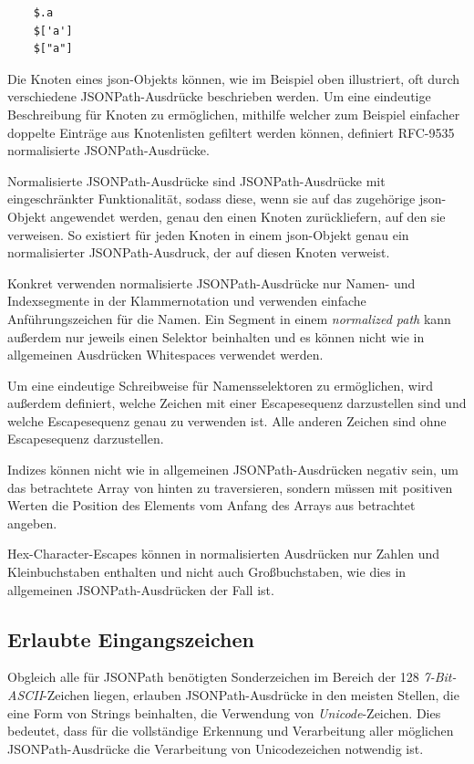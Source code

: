 \documentclass[oneside]{ausarbeitung}
\begin{document}
\begin{lstlisting}
	$.a
	$['a']
	$["a"]
\end{lstlisting}
	
Die Knoten eines \ac{json}-Objekts können, wie im Beispiel oben illustriert, oft durch verschiedene JSONPath-Ausdrücke beschrieben werden. Um eine eindeutige Beschreibung für Knoten zu ermöglichen, mithilfe welcher zum Beispiel einfacher doppelte Einträge aus Knotenlisten gefiltert werden können, definiert RFC-9535 normalisierte JSONPath-Ausdrücke.
	
Normalisierte JSONPath-Ausdrücke sind JSONPath-Ausdrücke mit eingeschränkter Funktionalität, sodass diese, wenn sie auf das zugehörige \ac{json}-Objekt angewendet werden, genau den einen Knoten zurückliefern, auf den sie verweisen. So existiert für jeden Knoten in einem \ac{json}-Objekt genau ein normalisierter JSONPath-Ausdruck, der auf diesen Knoten verweist. 
	
Konkret verwenden normalisierte JSONPath-Ausdrücke nur Namen- und Indexsegmente in der Klammernotation und verwenden einfache Anführungszeichen für die Namen. Ein Segment in einem \textit{normalized path} kann außerdem nur jeweils einen Selektor beinhalten und es können nicht wie in allgemeinen Ausdrücken Whitespaces verwendet werden. 
	
Um eine eindeutige Schreibweise für Namensselektoren zu ermöglichen, wird außerdem definiert, welche Zeichen mit einer Escapesequenz darzustellen sind und welche Escapesequenz genau zu verwenden ist. Alle anderen Zeichen sind ohne Escapesequenz darzustellen.
	
Indizes können nicht wie in allgemeinen JSONPath-Ausdrücken negativ sein, um das betrachtete Array von hinten zu traversieren, sondern müssen mit positiven Werten die Position des Elements vom Anfang des Arrays aus betrachtet angeben.
	
Hex-Character-Escapes können in normalisierten Ausdrücken nur Zahlen und Kleinbuchstaben enthalten und nicht auch Großbuchstaben, wie dies in allgemeinen JSONPath-Ausdrücken der Fall ist.
	
	

\pagebreak
	
\subsection{Erlaubte Eingangszeichen}
	
Obgleich alle für JSONPath benötigten Sonderzeichen im Bereich der 128 \textit{7-Bit-ASCII}-Zeichen liegen, erlauben JSONPath-Ausdrücke in den meisten Stellen, die eine Form von Strings beinhalten, die Verwendung von \textit{Unicode}-Zeichen. Dies bedeutet, dass für die vollständige Erkennung und Verarbeitung aller möglichen JSONPath-Ausdrücke die Verarbeitung von Unicodezeichen notwendig ist.
	
\end{document}
